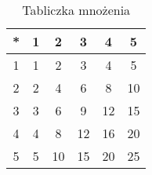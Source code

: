 \begin{table}[h]
\centering
\begin{tabular}{|c|c|c|c|c|c|}
\hline
*  & \textbf{1} & \textbf{2} & \textbf{3} & \textbf{4} &\textbf{5}   \\ \hline
1  &    1       &     2      &      3     &     4       &   5 \\ \hline 
2  &    2       &     4      &      6     &     8       &   10\\ \hline
3  &    3       &     6      &      9     &     12      &   15 \\ \hline
4  &    4       &     8      &      12     &     16     &   20\\ \hline
5  &    5       &     10      &      15     &     20     &   25\\ \hline
\end{tabular}
\caption{Tabliczka mnożenia}
\label{tab Z4}
\end{table}